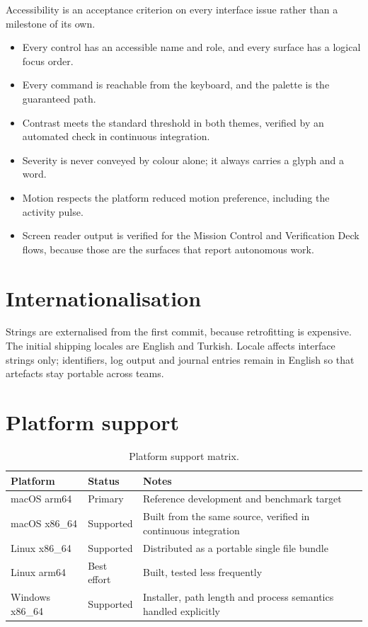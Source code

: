 Accessibility is an acceptance criterion on every interface issue rather than a milestone of
its own.

\begin{itemize}
  \item Every control has an accessible name and role, and every surface has a logical focus
  order.
  \item Every command is reachable from the keyboard, and the palette is the guaranteed path.
  \item Contrast meets the standard threshold in both themes, verified by an automated check
  in continuous integration.
  \item Severity is never conveyed by colour alone; it always carries a glyph and a word.
  \item Motion respects the platform reduced motion preference, including the activity pulse.
  \item Screen reader output is verified for the Mission Control and Verification Deck flows,
  because those are the surfaces that report autonomous work.
\end{itemize}

\section{Internationalisation}

Strings are externalised from the first commit, because retrofitting is expensive. The
initial shipping locales are English and Turkish. Locale affects interface strings only;
identifiers, log output and journal entries remain in English so that artefacts stay
portable across teams.

\section{Platform support}

\begin{table}[h]
\centering
\small
\begin{tabularx}{\textwidth}{l l X}
\toprule
\textbf{Platform} & \textbf{Status} & \textbf{Notes} \\
\midrule
macOS arm64 & Primary & Reference development and benchmark target \\
macOS x86\_64 & Supported & Built from the same source, verified in continuous integration \\
Linux x86\_64 & Supported & Distributed as a portable single file bundle \\
Linux arm64 & Best effort & Built, tested less frequently \\
Windows x86\_64 & Supported & Installer, path length and process semantics handled explicitly \\
\bottomrule
\end{tabularx}
\caption{Platform support matrix.}
\end{table}

